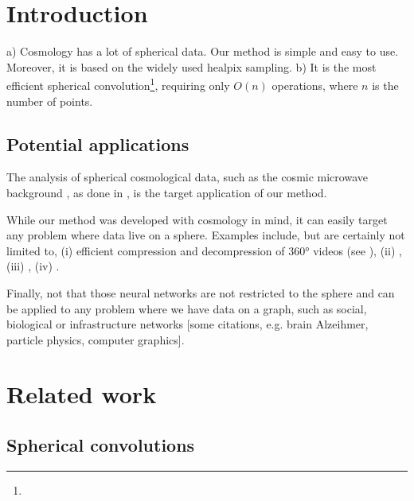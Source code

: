 \documentclass[preprint,12pt,authoryear]{elsarticle}
\newcommand{\todo}[1]{{\color[rgb]{.6,.1,.6}{#1}}}
\newcommand{\assign}[1]{{\color[rgb]{.8,.5,.8}{Assigned: #1 }}}
\begin{document}

\section{Introduction}
\label{sec:intro}

\assign{Tomek}

a) Cosmology has a lot of spherical data. Our method is simple and easy to use. Moreover, it is based on the widely used healpix sampling.
b) It is the most efficient spherical convolution\footnote{\todo{provably? cannot be faster than O(n) without approximations, e.g. sketching}}, requiring only $O(n)$ operations, where $n$ is the number of points.

\subsection{Potential applications}
	\assign{Tomek, Nathanaël, Michaël}

The analysis of spherical cosmological data, such as the cosmic microwave background \cite{...}, as done in \cite{he2018analysis}, is the target application of our method.

While our method was developed with cosmology in mind, it can easily target any problem where data live on a sphere. Examples include, but are certainly not limited to, (i) efficient compression and decompression of \ang{360} videos (see \cite{su2017learning}), (ii) \todo{data analysis on planets? (climate, forecasting, temperature, wind)}, (iii) \todo{particle physics? (jets on detectors, but they are usually cylindrical)}, (iv) \todo{applications in Cohen's papers?}.

Finally, not that those neural networks are not restricted to the sphere and can be applied to any problem where we have data on a graph, such as social, biological or infrastructure networks [some citations, e.g. brain Alzeihmer, particle physics, computer graphics].

\section{Related work}
\label{sec:related}

\subsection{Spherical convolutions}
\assign{Nathanaël}
\end{document}
